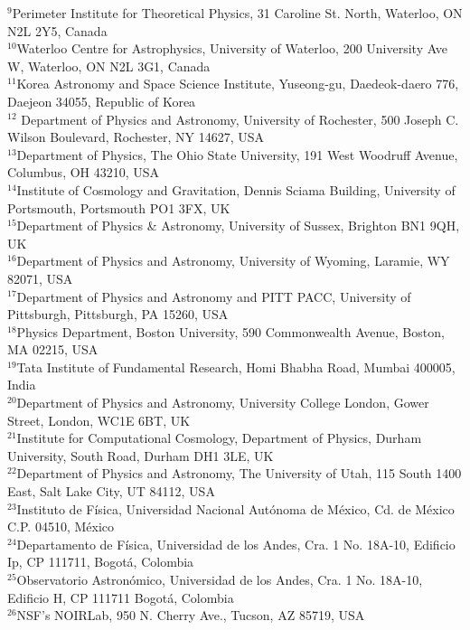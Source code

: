 {$^{9}$Perimeter Institute for Theoretical Physics, 31 Caroline St. North, Waterloo, ON N2L 2Y5, Canada\\
$^{10}$Waterloo Centre for Astrophysics, University of Waterloo, 200 University Ave W, Waterloo, ON N2L 3G1, Canada\\
$^{11}$Korea Astronomy and Space Science Institute, Yuseong-gu, Daedeok-daero 776, Daejeon 34055, Republic of Korea\\
$^{12}$ Department of Physics and Astronomy, University of Rochester, 500 Joseph C. Wilson Boulevard, Rochester, NY 14627, USA \\
$^{13}$Department of Physics, The Ohio State University, 191 West Woodruff Avenue, Columbus, OH 43210, USA\\
$^{14}$Institute of Cosmology and Gravitation, Dennis Sciama Building, University of Portsmouth, Portsmouth PO1 3FX, UK \\
$^{15}$Department of Physics \& Astronomy, University of Sussex, Brighton BN1 9QH, UK\\
$^{16}$Department of Physics and Astronomy, University of Wyoming, Laramie, WY 82071, USA\\
$^{17}$Department of Physics and Astronomy and PITT PACC, University of Pittsburgh, Pittsburgh, PA 15260, USA\\
$^{18}$Physics Department, Boston University, 590 Commonwealth Avenue, Boston, MA 02215,
USA\\
$^{19}$Tata Institute of Fundamental Research, Homi Bhabha Road, Mumbai 400005, India\\
$^{20}$Department of Physics and Astronomy, University College London, Gower Street, London,
WC1E 6BT, UK\\
$^{21}$Institute for Computational Cosmology, Department of Physics, Durham University, South Road, Durham DH1 3LE, UK\\
$^{22}$Department of Physics and Astronomy, The University of Utah, 115 South 1400 East, Salt Lake City, UT 84112, USA\\
$^{23}$Instituto de Física, Universidad Nacional Autónoma de México, Cd. de México C.P. 04510,
México\\
$^{24}$Departamento de F\'isica, Universidad de los Andes, Cra. 1 No. 18A-10, Edificio Ip, CP 111711, Bogot\'a, Colombia\\
$^{25}$Observatorio Astron\'omico, Universidad de los Andes, Cra. 1 No. 18A-10, Edificio H, CP 111711 Bogot\'a, Colombia\\
$^{26}$NSF's NOIRLab, 950 N. Cherry Ave., Tucson, AZ 85719, USA\\
}
